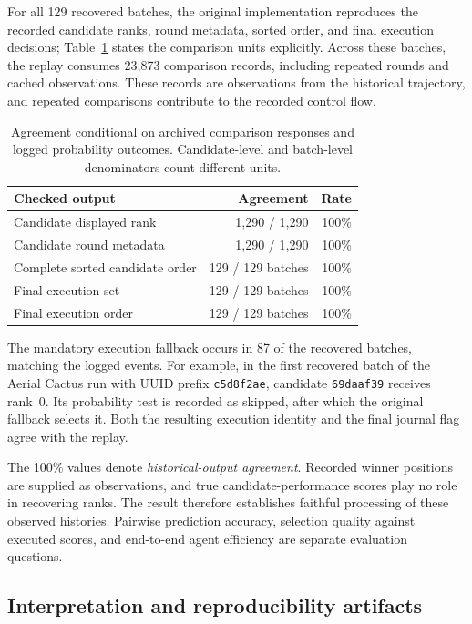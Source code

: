 For all 129 recovered batches, the original implementation reproduces the recorded candidate ranks, round metadata, sorted order, and final execution decisions; Table~\ref{tab:agreement} states the comparison units explicitly. Across these batches, the replay consumes 23,873 comparison records, including repeated rounds and cached observations. These records are observations from the historical trajectory, and repeated comparisons contribute to the recorded control flow.

\begin{table}[htbp]
  \centering
  \caption{Agreement conditional on archived comparison responses and logged probability outcomes. Candidate-level and batch-level denominators count different units.}
  \label{tab:agreement}
  \begin{tabular}{lrr}
    \toprule
    Checked output & Agreement & Rate \\
    \midrule
    Candidate displayed rank & 1,290 / 1,290 & 100\% \\
    Candidate round metadata & 1,290 / 1,290 & 100\% \\
    Complete sorted candidate order & 129 / 129 batches & 100\% \\
    Final execution set & 129 / 129 batches & 100\% \\
    Final execution order & 129 / 129 batches & 100\% \\
    \bottomrule
  \end{tabular}
\end{table}

The mandatory execution fallback occurs in 87 of the recovered batches, matching the logged events. For example, in the first recovered batch of the Aerial Cactus run with UUID prefix \texttt{c5d8f2ae}, candidate \texttt{69daaf39} receives rank~0. Its probability test is recorded as skipped, after which the original fallback selects it. Both the resulting execution identity and the final journal flag agree with the replay.

The 100\% values denote \emph{historical-output agreement}. Recorded winner positions are supplied as observations, and true candidate-performance scores play no role in recovering ranks. The result therefore establishes faithful processing of these observed histories. Pairwise prediction accuracy, selection quality against executed scores, and end-to-end agent efficiency are separate evaluation questions.

\subsection{Interpretation and reproducibility artifacts}

